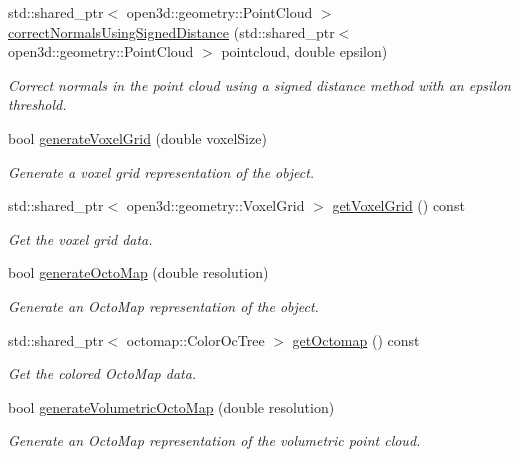 \begin{DoxyCompactItemize}
std\+::shared\+\_\+ptr$<$ open3d\+::geometry\+::\+Point\+Cloud $>$ \hyperlink{classvisioncraft_1_1ModelLoader_a42b8e7af7cf349fc4dce108198927372}{correct\+Normals\+Using\+Signed\+Distance} (std\+::shared\+\_\+ptr$<$ open3d\+::geometry\+::\+Point\+Cloud $>$ pointcloud, double epsilon)
\begin{DoxyCompactList}\small\item\em Correct normals in the point cloud using a signed distance method with an epsilon threshold. \end{DoxyCompactList}\item 
bool \hyperlink{classvisioncraft_1_1ModelLoader_ae3d3cc69a0d2c80d50cbc125f604807c}{generate\+Voxel\+Grid} (double voxel\+Size)
\begin{DoxyCompactList}\small\item\em Generate a voxel grid representation of the object. \end{DoxyCompactList}\item 
std\+::shared\+\_\+ptr$<$ open3d\+::geometry\+::\+Voxel\+Grid $>$ \hyperlink{classvisioncraft_1_1ModelLoader_ad13c4d532926aecf7e4247306a283531}{get\+Voxel\+Grid} () const
\begin{DoxyCompactList}\small\item\em Get the voxel grid data. \end{DoxyCompactList}\item 
bool \hyperlink{classvisioncraft_1_1ModelLoader_ad2529440bdadcd3a2adcd285d10c6bde}{generate\+Octo\+Map} (double resolution)
\begin{DoxyCompactList}\small\item\em Generate an Octo\+Map representation of the object. \end{DoxyCompactList}\item 
std\+::shared\+\_\+ptr$<$ octomap\+::\+Color\+Oc\+Tree $>$ \hyperlink{classvisioncraft_1_1ModelLoader_ab4958a63b88acb8734245e5b1a1c13dc}{get\+Octomap} () const
\begin{DoxyCompactList}\small\item\em Get the colored Octo\+Map data. \end{DoxyCompactList}\item 
bool \hyperlink{classvisioncraft_1_1ModelLoader_a66caf48531a5fb73dd3d8ad17540592f}{generate\+Volumetric\+Octo\+Map} (double resolution)
\begin{DoxyCompactList}\small\item\em Generate an Octo\+Map representation of the volumetric point cloud. \end{DoxyCompactList}\item 

\end{DoxyCompactItemize}
